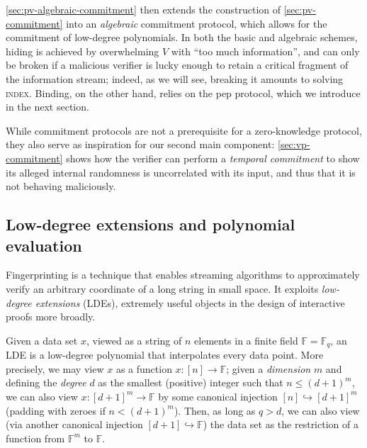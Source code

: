 \documentclass[10pt,a4paper]{article}
\theoremstyle{definition}
\newcommand{\field}{\mathbb{F}}
\newcommand{\indexproblem}{\normalfont\textsc{index}\xspace}
\newcommand{\pepprotocol}{\textsf{pep}\xspace}
\newcommand{\dimension}{m}
\newcommand{\degree}{d}
\newcommand{\fieldsize}{q}
\begin{document}
\cref{sec:pv-algebraic-commitment} then extends the construction of \cref{sec:pv-commitment} into an \emph{algebraic} commitment protocol, which allows for the commitment of low-degree polynomials. In both the basic and algebraic schemes, hiding is achieved by overwhelming $V$ with ``too much information'', and can only be broken if a malicious verifier is lucky enough to retain a critical fragment of the information stream; indeed, as we will see, breaking it amounts to solving \indexproblem. Binding, on the other hand, relies on the \pepprotocol protocol, which we introduce in the next section.

While commitment protocols are not a prerequisite for a zero-knowledge protocol, they also serve as inspiration for our second main component: \cref{sec:vp-commitment} shows how the verifier can perform a \emph{temporal commitment} to show its alleged internal randomness is uncorrelated with its input, and thus that it is not behaving maliciously.

\subsection{Low-degree extensions and polynomial evaluation}
\label{sec:lde-pep}

Fingerprinting is a technique that enables streaming algorithms to approximately verify an arbitrary coordinate of a long string in small space. It exploits \emph{low-degree extensions} (LDEs), extremely useful objects in the design of interactive proofs more broadly.

Given a data set $x$, viewed as a string of $n$ elements in a finite field $\field = \field_q$, an LDE is a low-degree polynomial that interpolates every data point. More precisely, we may view $x$ as a function $x: [n] \to \field$; given a \emph{dimension} $\dimension$ and defining the \emph{degree}  $\degree$ as the smallest (positive) integer such that $n \leq (\degree + 1)^\dimension$, we can also view $x: [\degree + 1]^\dimension \to \field$ by some canonical injection $[n] \hookrightarrow [\degree + 1]^\dimension$ (padding with zeroes if $n < (\degree + 1)^\dimension$). Then, as long as $\fieldsize > \degree$, we can also view (via another canonical injection $[\degree + 1] \hookrightarrow \field$) the data set as the restriction of a function from $\field^\dimension$ to $\field$.
\end{document}
